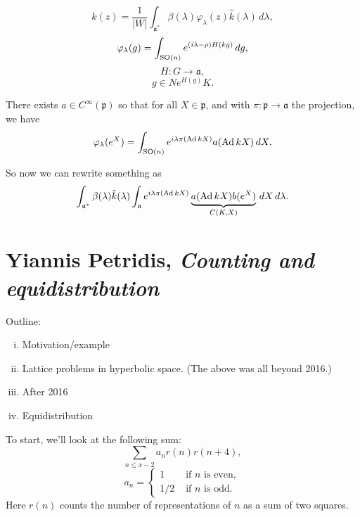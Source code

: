 \documentclass[reqno]{amsart} 
\begin{document}
\begin{equation*}
  k(z) = \frac{1}{\lvert W \rvert}
  \int_{\mathfrak{a}^\ast }
  \beta (\lambda) \varphi_\lambda (z) \hat{k} (\lambda) \, d \lambda,
\end{equation*}
\begin{equation*}
  \varphi_\lambda (g) = \int_{\operatorname{SO}(n)}
  e^{(i \lambda - \rho ) H (k g)} \, d g,
\end{equation*}
\begin{equation*}
  H : G \rightarrow \mathfrak{a},
\end{equation*}
\begin{equation*}
  g \in N e^{H(g)} K.
\end{equation*}

\begin{theorem}[Duistermaat]
  There exists $a \in C^\infty(\mathfrak{p})$ so that for all $X \in \mathfrak{p}$, and with $\pi : \mathfrak{p} \rightarrow \mathfrak{a}$ the projection, we have
  \begin{equation*}
    \varphi_\lambda (e^X ) = \int_{\operatorname{SO}(n)} e^{i \lambda \pi (\operatorname{Ad} k X )}
    a (\operatorname{Ad} k X)
    \, d X.
  \end{equation*}
\end{theorem}

So now we can rewrite something as
\begin{equation*}
  \int_{\mathfrak{a}^\ast } \beta (\lambda) \hat{k} (\lambda)
  \int_{\mathfrak{a} } e^{i \lambda \pi (\operatorname{Ad} k X)}
  \underbrace
{
a (\operatorname{Ad} k X ) b (e^X )
}_{
C(K,X)
}
  \, d X \, d \lambda.
\end{equation*}

\section{Yiannis Petridis, \emph{Counting and equidistribution}}

Outline:
\begin{enumerate}[(i)]
\item Motivation/example
\item Lattice problems in hyperbolic space.  (The above was all beyond 2016.)
\item After 2016
\item Equidistribution
\end{enumerate}

To start, we'll look at the following sum:
\begin{equation*}
  \sum_{n \leq x - 2}
  a_n r (n) r (n + 4),
\end{equation*}
\begin{equation*}
  a_n =
  \begin{cases}
    1 & \text{ if $n$ is even}, \\
    1/2 & \text{ if $n$ is odd}.
  \end{cases}
\end{equation*}
Here $r(n)$ counts the number of representations of $n$ as a sum of two squares.
\end{document}
